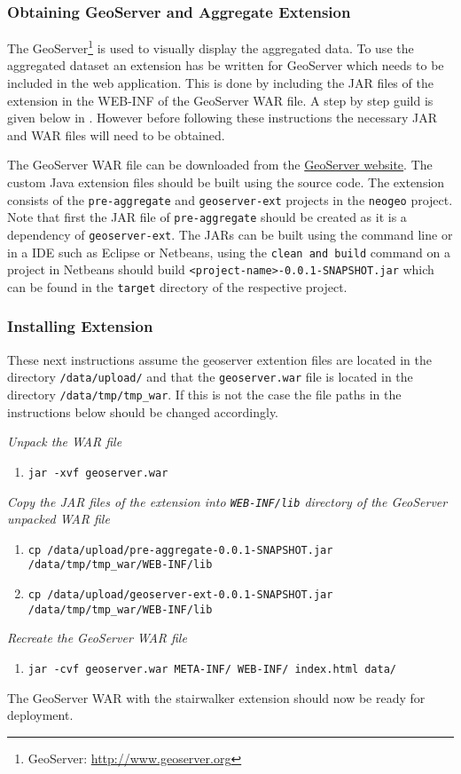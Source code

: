 \subsubsection{Obtaining GeoServer and Aggregate Extension}
The GeoServer\footnote{GeoServer: \url{http://www.geoserver.org}} is used to visually display the aggregated data. To use the aggregated dataset an extension has be written for GeoServer which needs to be included in the web application. This is done by including the JAR files of the extension in the WEB-INF of the GeoServer WAR file. A step by step guild is given below in . However before following these instructions the necessary JAR and WAR files will need to be obtained.

The GeoServer WAR file can be downloaded from the \href{http://www.geoserver.org/download/}{GeoServer website}. The custom Java extension files should be built using the source code. The extension consists of the \lstinline|pre-aggregate| and \lstinline|geoserver-ext| projects in the \lstinline|neogeo| project. Note that first the JAR file of \lstinline|pre-aggregate| should be created as it is a dependency of \lstinline|geoserver-ext|. The JARs can be built using the command line or in a IDE such as Eclipse or Netbeans, using the \lstinline|clean and build| command on a project in Netbeans should build \lstinline|<project-name>-0.0.1-SNAPSHOT.jar| which can be found in the \lstinline|target| directory of the respective project.

\subsubsection{Installing Extension}
\label{sec:InstallExtension}
\noindent These next instructions assume the geoserver extention files are located in the directory \lstinline|/data/upload/| and that the \lstinline|geoserver.war| file is located in the directory \mbox{\lstinline|/data/tmp/tmp_war|}. If this is not the case the file paths in the instructions below should be changed accordingly. \newline

\noindent \textit{Unpack the WAR file}
\begin{enumerate}
	\item \lstinline|jar -xvf geoserver.war|
\end{enumerate}
\textit{Copy the JAR files of the extension into \lstinline|WEB-INF/lib| directory of the GeoServer unpacked WAR file}
\begin{enumerate}[resume]
	\item \lstinline|cp /data/upload/pre-aggregate-0.0.1-SNAPSHOT.jar /data/tmp/tmp_war/WEB-INF/lib|
	\item \lstinline|cp /data/upload/geoserver-ext-0.0.1-SNAPSHOT.jar /data/tmp/tmp_war/WEB-INF/lib|
\end{enumerate}
\textit{Recreate the GeoServer WAR file}
\begin{enumerate}[resume]
	\item \lstinline|jar -cvf geoserver.war META-INF/ WEB-INF/ index.html data/|
\end{enumerate}
The GeoServer WAR with the stairwalker extension should now be ready for deployment.

